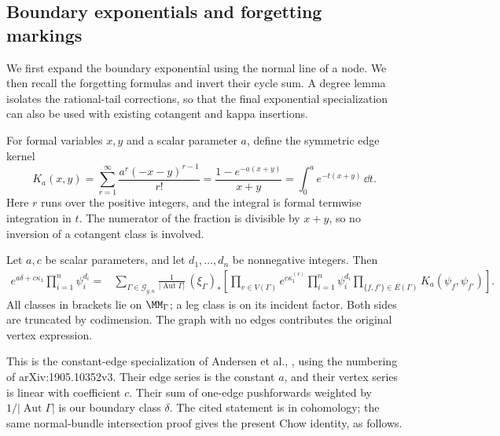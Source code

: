 \subsection{Boundary exponentials and forgetting markings}
\label{subsec:s02:04}

We first expand the boundary exponential using the normal line of a
node.  We then recall the forgetting formulas and invert their cycle
sum.  A degree lemma isolates the rational-tail corrections, so that
the final exponential specialization can also be used with existing
cotangent and kappa insertions.

For formal variables $x,y$ and a scalar parameter $a$, define the
symmetric edge kernel
\begin{equation}
\label{eq:s02:edge-kernel}
K_a(x,y)=\sum_{r=1}^{\infty}\frac{a^r(-x-y)^{r-1}}{r!}
=\frac{1-e^{-a(x+y)}}{x+y}
=\int_0^a e^{-t(x+y)}\,\dd t.
\end{equation}
Here $r$ runs over the positive integers, and the integral is formal
termwise integration in $t$.  The numerator of the fraction is
divisible by $x+y$, so no inversion of a cotangent class is involved.

\begin{prp}
\label{prp:s02:boundary-exponential}
Let $a,c$ be scalar parameters, and let $d_1,\ldots,d_n$ be
nonnegative integers.  Then
\begin{equation}
\label{eq:s02:boundary-exponential}
\begin{split}
e^{a\delta+c\kappa_1}\prod_{i=1}^n\psi_i^{d_i}
={}&\sum_{\Gamma\in\mathcal G_{g,n}}
\frac{1}{|\operatorname{Aut}\Gamma|}\,
(\xi_\Gamma)_*\left[
\prod_{v\in V(\Gamma)}e^{c\kappa_1^{(v)}}
\prod_{i=1}^n\psi_i^{d_i}
\prod_{\{f,f'\}\in E(\Gamma)}K_a(\psi_f,\psi_{f'})
\right].
\end{split}
\end{equation}
All classes in brackets lie on $\MM_\Gamma$; a leg class is on its
incident factor.  Both sides are truncated by codimension.  The graph
with no edges contributes the original vertex expression.
\end{prp}

This is the constant-edge specialization of Andersen et al.,
\cite[Lemma 3.10, (3.18)--(3.22)]{ABCDGLW23}, using the numbering of
arXiv:1905.10352v3.  Their edge series is the constant $a$, and their
vertex series is linear with coefficient $c$.  Their sum of one-edge
pushforwards weighted by $1/|\operatorname{Aut}\Gamma|$ is our
boundary class $\delta$.  The cited statement is in cohomology; the
same normal-bundle intersection proof gives the present Chow identity,
as follows.


